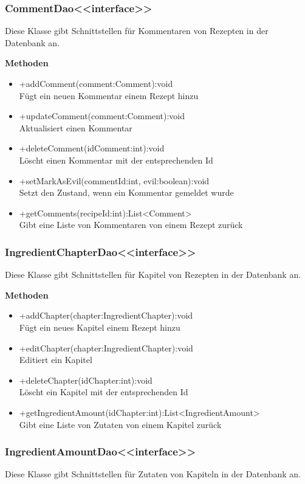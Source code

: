 \subsubsection{CommentDao<<interface>>}
Diese Klasse gibt Schnittstellen für Kommentaren von Rezepten in der Datenbank an.

\textbf{Methoden}
\begin{itemize}
	\item +addComment(comment:Comment):void \\Fügt ein neuen Kommentar einem Rezept hinzu
	\item +updateComment(comment:Comment):void \\Aktualisiert einen Kommentar
	\item +deleteComment(idComment:int):void \\Löscht einen Kommentar mit der entsprechenden Id
	\item +setMarkAsEvil(commentId:int, evil:boolean):void \\Setzt den Zustand, wenn ein Kommentar gemeldet wurde
	\item +getComments(recipeId:int):List<Comment> \\Gibt eine Liste von Kommentaren von einem Rezept zurück
\end{itemize}

\subsubsection{IngredientChapterDao<<interface>>}
Diese Klasse gibt Schnittstellen für Kapitel von Rezepten in der Datenbank an.

\textbf{Methoden}
\begin{itemize}
	\item +addChapter(chapter:IngredientChapter):void \\Fügt ein neues Kapitel einem Rezept hinzu
	\item +editChapter(chapter:IngredientChapter):void \\Editiert ein Kapitel
	\item +deleteChapter(idChapter:int):void \\Löscht ein Kapitel mit der entsprechenden Id
	\item +getIngredientAmount(idChapter:int):List<IngredientAmount> \\Gibt eine Liste von Zutaten von einem Kapitel zurück
\end{itemize}

\subsubsection{IngredientAmountDao<<interface>>}
Diese Klasse gibt Schnittstellen für Zutaten von Kapiteln in der Datenbank an.

